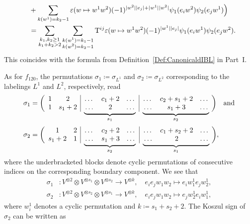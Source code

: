 \documentclass[\MainFolder/Text.tex]{subfiles}
\begin{document}
\begin{Example}
$$\begin{aligned}
&\quad {}+ \sum_{k(w^1) = k_2 - 1} \varepsilon(w\mapsto w^1 w^2) (-1)^{|w^2||e_j| + |w^1||w^2|} \psi_1(e_i w^2) \psi_2(e_j w^1)\Bigr) \\
&\quad =\sum_{\substack{k_1, k_2 \ge 1 \\ k_1 + k_2 > 2}} \sum_{\substack{ k(w^1) = k_1 - 1 \\ k(w^2) = k_2 - 1}}  \mathrm{T}^{ij}\varepsilon(w \mapsto w^1 w^2) (-1)^{|w^1||e_j|} \psi_1(e_i w^1) \psi_2(e_j w^2).
\end{aligned}$$
This coincides with the formula from Definition~\ref{Def:CanonicaldIBL} in Part~I.

As for $f_{120}$, the permutations $\sigma_1\coloneqq\sigma_{L^1}$ and $\sigma_2\coloneqq \sigma_{L^2}$ corresponding to the labelings $L^1$ and $L^2$, respectively, read
$$\begin{aligned}
\sigma_{1} &= \biggl(\begin{array}{cc|ccc|ccc}
1 & 2      & \dots & c_1+2 & \dots & \dots & c_2 + s_1 + 2 & \dots \\
 1 & s_1 + 2& \undermat{s_1}{\dots & c_1+2 & \dots}\dots & 2 & \dots &\undermat{s_2}{\dots & c_2 + s_1 + 2 & \dots}\dots & s_1 + 3 & \dots
\end{array}\biggr)\quad\text{and} \\[4ex]
\sigma_{2} &= \biggl(\begin{array}{cc|ccc|ccc}
 1       & 2 &  \dots  & c_2 + 2 & \dots & \dots & c_1 + s_2 + 2 & \dots  \\
 s_1 + 2 & 1 & \undermat{s_2}{\dots & c_2+2 & \dots} \dots  & s_1 + 3 & \dots & \undermat{s_1}{\dots & c_1 + s_2 + 2 & \dots} \dots &  2     & \dots
\end{array}\biggr), \\[3ex]
\end{aligned}$$
where the underbracketed blocks denote cyclic permutations of consecutive indices on the corresponding boundary component. We see that 
$$\begin{aligned}
\sigma_1 &: V^{\otimes 2}\otimes V^{\otimes s_1}\otimes V^{\otimes s_2} \longrightarrow V^{\otimes k}, \quad e_i e_j w_1 w_2 \longmapsto e_i w_1^1 e_j w_2^1, \\
\sigma_2 &:  V^{\otimes 2}\otimes V^{\otimes s_2} \otimes V^{\otimes s_1} \longrightarrow V^{\otimes k}, \quad  e_i e_j w_1 w_2 \longmapsto e_j w_2^1 e_i w_1^1,
\end{aligned}$$
where $w_i^1$ denotes a cyclic permutation and $k\coloneqq s_1 + s_2 +2$. The Koszul sign of~$\sigma_2$ can be written as

\end{Example}
\end{document}
